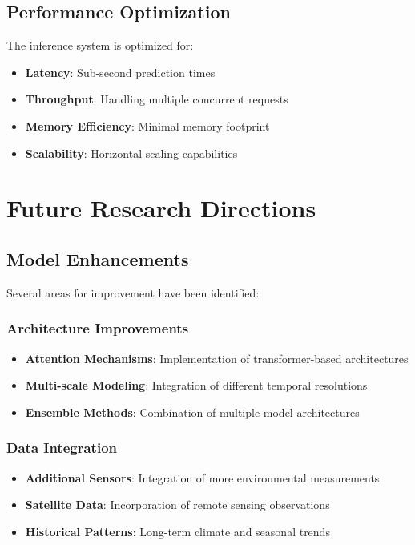 \documentclass[12pt,a4paper]{article}
\begin{document}
\subsection{Performance Optimization}
The inference system is optimized for:
\begin{itemize}
    \item \textbf{Latency}: Sub-second prediction times
    \item \textbf{Throughput}: Handling multiple concurrent requests
    \item \textbf{Memory Efficiency}: Minimal memory footprint
    \item \textbf{Scalability}: Horizontal scaling capabilities
\end{itemize}

\section{Future Research Directions}

\subsection{Model Enhancements}
Several areas for improvement have been identified:

\subsubsection{Architecture Improvements}
\begin{itemize}
    \item \textbf{Attention Mechanisms}: Implementation of transformer-based architectures
    \item \textbf{Multi-scale Modeling}: Integration of different temporal resolutions
    \item \textbf{Ensemble Methods}: Combination of multiple model architectures
\end{itemize}

\subsubsection{Data Integration}
\begin{itemize}
    \item \textbf{Additional Sensors}: Integration of more environmental measurements
    \item \textbf{Satellite Data}: Incorporation of remote sensing observations
    \item \textbf{Historical Patterns}: Long-term climate and seasonal trends
\end{itemize}
\end{document}
